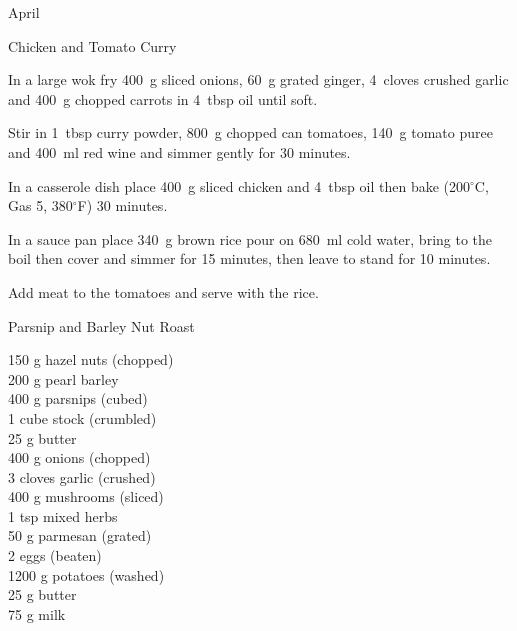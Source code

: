 \begin{menu}{April}
\begin{recipe}{2}{Chicken and Tomato Curry}
\begin{ingredients}
		\end{ingredients}
	
	
	
    \begin{instructions}
    \item 
        In a large wok fry
        400~g sliced onions,
        60~g grated ginger,
        4~cloves crushed garlic
        and
        400~g chopped carrots
        in
        4~tbsp  oil
        until soft.
      \item 
        Stir in
        1~tbsp  curry powder,
        800~g chopped can tomatoes,
        140~g  tomato puree
        and
        400~ml  red wine
        and simmer gently for 30 minutes.
      \item 
        In a casserole dish place
        400~g sliced chicken
        and
        4~tbsp  oil
        then bake (200$^{\circ}$C, Gas 5, 380$^{\circ}$F) 30 minutes.
      \item 
    In a
    sauce pan
    place
    340~g  brown rice
    pour on
    680~ml  cold water,
    bring to the boil then cover and simmer for 15 minutes,
    then leave to stand for 10 minutes.
  \item 
        Add meat to the tomatoes and serve with the rice.
      
    \end{instructions}
    \end{recipe}%
  
    \begin{recipe}{2}{Parsnip and Barley Nut Roast}%
		\begin{ingredients}
		150 g hazel nuts (chopped) \\
	200 g pearl barley  \\
	400 g parsnips (cubed) \\
	1 cube stock (crumbled) \\
	25 g butter  \\
	400 g onions (chopped) \\
	3 cloves garlic (crushed) \\
	400 g mushrooms (sliced) \\
	1 tsp mixed herbs  \\
	50 g parmesan (grated) \\
	2  eggs (beaten) \\
	1200 g potatoes (washed) \\
	25 g butter  \\
	75 g milk  \\
	

\end{ingredients}
\end{recipe}
\end{menu}
